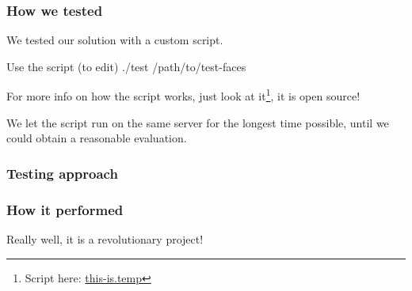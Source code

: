 \begin{frame} \frametitle{How we tested}

	We tested our solution with a custom script.
	
	\vfill

	\begin{block}{Use the script (to edit)}
		./test /path/to/test-faces
	\end{block}
	
	For more info on how the script works, just look at 
	it\footnote{Script here: 
	{\color{red} \url{this-is.temp}}}, it is open source!

	\vfill
	
	We let the script run on the same server for the longest
	time possible, until we could obtain a reasonable evaluation.

\end{frame}

\begin{frame} \frametitle{Testing approach}

\end{frame}

\begin{frame} \frametitle{How it performed}

	Really well, it is a revolutionary project!

\end{frame}
